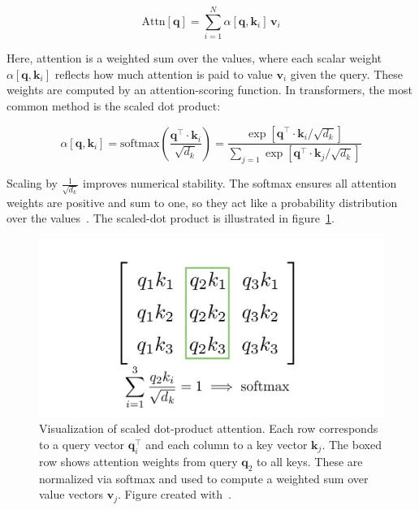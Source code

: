 \begin{equation}
\label{eq:attention}
	\mathrm{Attn}[\mathbf{q}] = \sum_{i=1}^{N} \alpha \left[ \mathbf{q}, \mathbf{k}_i \right] \, \mathbf{v}_i
\end{equation}

Here, attention is a weighted sum over the values, where each scalar weight $\alpha \left[ \mathbf{q}, \mathbf{k}_i \right]$ reflects how much attention is paid to value $\mathbf{v}_i$ given the query. These weights are computed by an attention-scoring function. In transformers, the most common method is the scaled dot product: 

\begin{equation}
\label{eq:attn_scaled_dotproduct}
	\alpha[\mathbf{q}, \mathbf{k}_i] =  \mathrm{softmax} \left( \frac{\mathbf{q}^{\intercal} \cdot \mathbf{k}_i}{\sqrt{d_k} } \right) = \frac{\exp[\mathbf{q}^{\intercal} \cdot \mathbf{k}_i / \sqrt{d_k}]}{\sum_{j=1} \exp[\mathbf{q}^{\intercal} \cdot \mathbf{k}_{j} / \sqrt{d_k}]}
\end{equation}

Scaling by $\frac{1}{\sqrt{d_k}}$ improves numerical stability. The softmax ensures all attention weights are positive and sum to one, so they act like a probability distribution over the values~\cite{prince_understanding_2023, zhang_dive_2023}. The scaled-dot product is illustrated in figure~\ref{fig:Scaled_dot_product}. 


\begin{figure}[t]
    \centering
    \includegraphics[width=0.75\linewidth]{figures/04_transformer/Attentionpattern.png}
    \caption{Visualization of scaled dot-product attention. Each row corresponds to a query vector $\mathbf{q}_i^{\intercal}$ and each column to a key vector $\mathbf{k}_j$. The boxed row shows attention weights from query $\mathbf{q}_2$ to all keys. These are normalized via softmax and used to compute a weighted sum over value vectors $\mathbf{v}_j$. Figure created with~\cite{the_manim_community_developers_manim_2025}.}
    \label{fig:Scaled_dot_product}
\end{figure}

